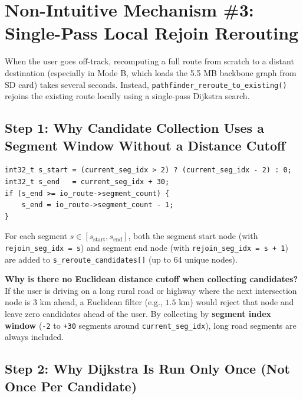 \documentclass[11pt,a4paper]{article}
\begin{document}
\section{Non-Intuitive Mechanism \#3: Single-Pass Local Rejoin Rerouting}

When the user goes off-track, recomputing a full route from scratch to a distant destination (especially in Mode B, which loads the 5.5 MB backbone graph from SD card) takes several seconds. Instead, \texttt{pathfinder\_reroute\_to\_existing()} rejoins the existing route locally using a single-pass Dijkstra search.

\subsection{Step 1: Why Candidate Collection Uses a Segment Window Without a Distance Cutoff}

\begin{lstlisting}[caption={Candidate collection window in \texttt{pathfinder\_reroute\_to\_existing()}}]
int32_t s_start = (current_seg_idx > 2) ? (current_seg_idx - 2) : 0;
int32_t s_end   = current_seg_idx + 30;
if (s_end >= io_route->segment_count) {
    s_end = io_route->segment_count - 1;
}
\end{lstlisting}

For each segment $s \in [s_{\text{start}}, s_{\text{end}}]$, both the segment start node (with \texttt{rejoin\_seg\_idx = s}) and segment end node (with \texttt{rejoin\_seg\_idx = s + 1}) are added to \texttt{s\_reroute\_candidates[]} (up to 64 unique nodes).

\textbf{Why is there no Euclidean distance cutoff when collecting candidates?}
If the user is driving on a long rural road or highway where the next intersection node is $3\text{ km}$ ahead, a Euclidean filter (e.g., $1.5\text{ km}$) would reject that node and leave zero candidates ahead of the user. By collecting by \textbf{segment index window} (\texttt{-2} to \texttt{+30} segments around \texttt{current\_seg\_idx}), long road segments are always included.

\subsection{Step 2: Why Dijkstra Is Run Only Once (Not Once Per Candidate)}
\end{document}
